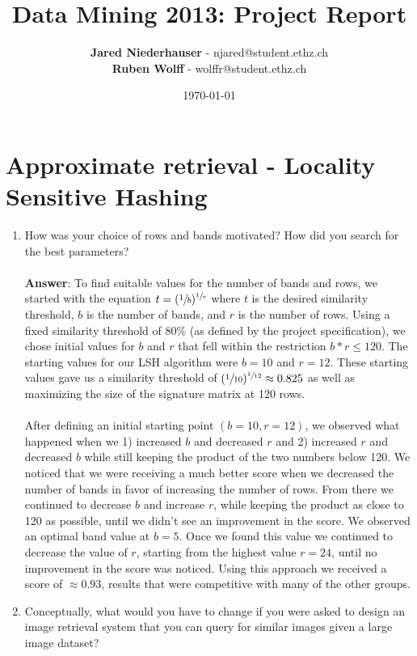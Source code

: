 \documentclass[11pt]{article}
\title{Data Mining 2013: Project Report}
\author{\textbf{Jared Niederhauser} - njared@student.ethz.ch\\
\textbf{Ruben Wolff} - wolffr@student.ethz.ch}
\date{\today}
\begin{document}
\maketitle

\section{Approximate retrieval - Locality Sensitive Hashing}
\begin{enumerate}
\item How was your choice of rows and bands motivated? How did you search for the
best parameters? \\ \\
\textbf{Answer}: To find suitable values for the number of bands and rows, we
started with the equation $t=(\sfrac{1}{b})^{\sfrac{1}{r}}$ where $t$ is the
desired similarity threshold, $b$ is the number of bands, and $r$ is the
number of rows.  Using a fixed similarity threshold of 80\% (as defined by the project specification), we chose initial values for
$b$ and $r$ that fell within the restriction $b*r\le 120$.  The
starting values for our LSH algorithm were $b=10$ and $r=12$.  These starting
values gave us a similarity threshold of
$(\sfrac{1}{10})^{\sfrac{1}{12}}\approx0.825$ as well as maximizing the size of
the signature matrix at 120 rows. \\ \\
After defining an initial starting point $(b=10, r=12)$, we observed what
happened when we 1) increased $b$ and decreased $r$ and 2) increased
$r$ and decreased $b$ while still keeping the product of the two
numbers below 120.  We noticed that we were receiving a much better score when
we decreased the number of bands in favor of increasing the number of rows. 
From there we continued to decrease $b$ and increase $r$, while
keeping the product as close to 120 as possible, until we didn't see an
improvement in the score.  We observed an optimal band value at $b=5$.  Once we
found this value we continued to decrease the value of $r$, starting from the
highest value $r=24$, until no improvement in the score was noticed.  Using this
approach we received a score of $\approx 0.93$, results that were competitive
with many of the other groups.

\item Conceptually, what would you have to change if you were asked to design an image
  retrieval system that you can query for similar images given a large image
  dataset? \\


\end{enumerate}
\end{document}
